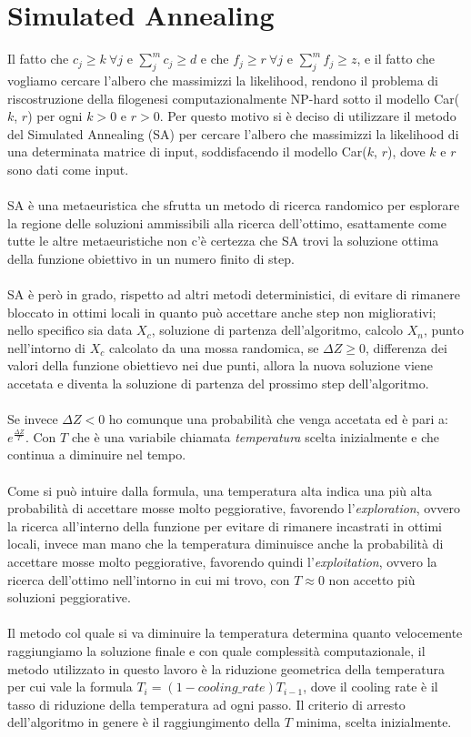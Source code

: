 \documentclass[12pt]{report}
\begin{document}
\section{Simulated Annealing}
  Il fatto che ${c}_{j}\geq k \ \forall j$ e $\sum_{j}^m {c}_{j} \geq d$ e che ${f}_{j}\geq r \ \forall j$ e $\sum_{j}^m {f}_{j} \geq z$, e il fatto che vogliamo cercare l'albero che massimizzi la likelihood, rendono il problema di riscostruzione della filogenesi computazionalmente NP-hard sotto il modello Car($k$, $r$) per ogni $k > 0$ e $r > 0$. Per questo motivo si è deciso di utilizzare il metodo del Simulated Annealing\cite{Kirkpatrick1983} (SA) per cercare l'albero che massimizzi la likelihood di una determinata matrice di input, soddisfacendo il modello Car($k$, $r$), dove $k$ e $r$ sono dati come input.\\\\
  SA è una metaeuristica che sfrutta un metodo di ricerca randomico per esplorare la regione delle soluzioni ammissibili alla ricerca dell'ottimo, esattamente come tutte le altre metaeuristiche non c'è certezza che SA trovi la soluzione ottima della funzione obiettivo in un numero finito di step.\\\\
  SA è però in grado, rispetto ad altri metodi deterministici, di evitare di rimanere bloccato in ottimi locali in quanto può accettare anche step non migliorativi; nello specifico sia data $X_{c}$, soluzione di partenza dell'algoritmo, calcolo $X_{n}$, punto nell'intorno di $X_{c}$ calcolato da una mossa randomica, se $\Delta Z\geq0$, differenza dei valori della funzione obiettievo nei due punti, allora la nuova soluzione viene accetata e diventa la soluzione di partenza del prossimo step dell'algoritmo.\\\\
  Se invece $\Delta Z < 0$ ho comunque una probabilità che venga accetata ed è pari a: $e^{\frac{\Delta Z}{T}}$.
  Con $T$ che è una variabile chiamata \emph{temperatura} scelta inizialmente e che continua a diminuire nel tempo.\\\\
  Come si può intuire dalla formula, una temperatura alta indica una più alta probabilità di accettare mosse molto peggiorative, favorendo l'\emph{exploration}, ovvero la ricerca all'interno della funzione per evitare di rimanere incastrati in ottimi locali, invece man mano che la temperatura diminuisce anche la probabilità di accettare mosse molto peggiorative, favorendo quindi l'\emph{exploitation}, ovvero la ricerca dell'ottimo nell'intorno in cui mi trovo, con $T\approx 0$ non accetto più soluzioni peggiorative.\\\\
  Il metodo col quale si va diminuire la temperatura determina quanto velocemente raggiungiamo la soluzione finale e con quale complessità computazionale, il metodo utilizzato in questo lavoro è la riduzione geometrica della temperatura per cui vale la formula $T_{i}=(1-cooling\_rate)T_{i-1}$, dove il cooling rate è il tasso di riduzione della temperatura ad ogni passo.
  Il criterio di arresto dell'algoritmo in genere è il raggiungimento della $T$ minima, scelta inizialmente.
\end{document}
